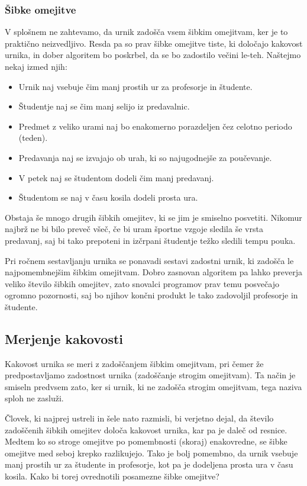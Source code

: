 \documentclass[a4paper,10pt]{article}
\begin{document}
 \subsubsection{Šibke omejitve}

V splošnem ne zahtevamo, da urnik zadošča vsem šibkim omejitvam, ker je to praktično neizvedljivo.
Resda pa so prav šibke omejitve tiste, ki določajo kakovost urnika, in dober algoritem bo
poskrbel, da se bo zadostilo večini le-teh. Naštejmo nekaj izmed njih:


\begin{itemize}
    

   \item Urnik naj vsebuje čim manj prostih ur za profesorje in študente.
   \item Študentje naj se čim manj selijo iz predavalnic.
   \item Predmet z veliko urami naj bo enakomerno porazdeljen čez celotno periodo (teden).
   \item Predavanja naj se izvajajo ob urah, ki so najugodnejše za poučevanje.
   \item V petek naj se študentom dodeli čim manj predavanj.
   \item Študentom se naj v času kosila dodeli prosta ura.
   \end{itemize}

\noindent
Obstaja še mnogo drugih šibkih omejitev, ki se jim je smiselno posvetiti. Nikomur najbrž ne
bi bilo preveč všeč, če bi uram športne vzgoje sledila še vrsta predavanj, saj bi tako
prepoteni in izčrpani študentje težko sledili tempu pouka.

Pri ročnem sestavljanju urnika se ponavadi sestavi zadostni urnik, ki zadošča le
najpomembnejšim šibkim omejitvam. Dobro zasnovan algoritem pa lahko preverja veliko
število šibkih omejitev, zato snovalci programov prav temu posvečajo ogromno pozornosti,
saj bo njihov končni produkt le tako zadovoljil profesorje in študente.

\subsection{Merjenje kakovosti }

Kakovost urnika se meri z zadoščanjem šibkim omejitvam, pri čemer že predpostavljamo
zadostnost urnika (zadoščanje strogim omejitvam). Ta način je smiseln predvsem zato,
ker si urnik, ki ne zadošča strogim omejitvam, tega naziva sploh ne zasluži.

Človek, ki najprej ustreli in šele nato razmisli, bi verjetno dejal, da število
zadoščenih šibkih omejitev določa kakovost urnika, kar pa je daleč od resnice. Medtem
ko so stroge omejitve po pomembnosti (skoraj) enakovredne, se šibke omejitve med seboj
krepko razlikujejo. Tako je bolj pomembno, da urnik vsebuje manj prostih ur za
študente in profesorje, kot pa je dodeljena prosta ura v času kosila. Kako bi torej
ovrednotili posamezne šibke omejitve?
\end{document}
